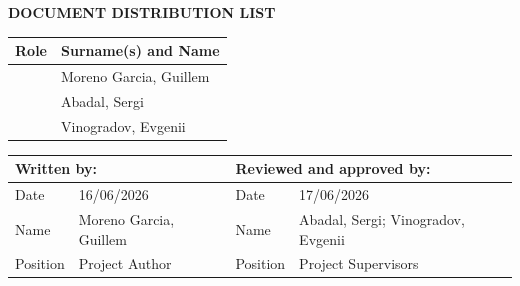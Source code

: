 \vspace{0.45cm}

\textbf{DOCUMENT DISTRIBUTION LIST}

\begin{tabularx}{\textwidth}{|l|X|}
  \hline
    \textbf{Role} & \textbf{Surname(s) and Name} \\
  \hline
    [Student] & Moreno Garcia, Guillem\\
  \hline
    [Project Supervisor 1] & Abadal, Sergi\\
  \hline
    [Project Supervisor 2] &  Vinogradov, Evgenii\\
  \hline
\end{tabularx}

\vspace{0.45cm}

\begin{tabularx}{\textwidth}{|l|X||l|X|}
  \hline
    \multicolumn{2}{|l||}{\textbf{Written by:}}  &  \multicolumn{2}{l|}{\textbf{Reviewed and approved by:}} \\
  \hline
    Date &  16/06/2026 & Date &  17/06/2026 \\
  \hline
    Name &  Moreno Garcia, Guillem & Name &  Abadal, Sergi; Vinogradov, Evgenii \\
  \hline
    Position & Project Author & Position & Project Supervisors \\
  \hline
\end{tabularx}
